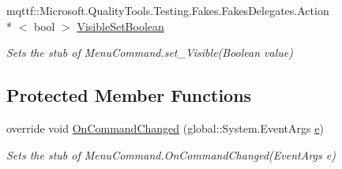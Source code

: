 \begin{DoxyCompactItemize}
mqttf\-::\-Microsoft.\-Quality\-Tools.\-Testing.\-Fakes.\-Fakes\-Delegates.\-Action\\*
$<$ bool $>$ \hyperlink{class_system_1_1_component_model_1_1_design_1_1_fakes_1_1_stub_designer_verb_a11a87d834a52ad8b5f003ac00c0f30b0}{Visible\-Set\-Boolean}
\begin{DoxyCompactList}\small\item\em Sets the stub of Menu\-Command.\-set\-\_\-\-Visible(\-Boolean value)\end{DoxyCompactList}\end{DoxyCompactItemize}
\subsection*{Protected Member Functions}
\begin{DoxyCompactItemize}
\item 
override void \hyperlink{class_system_1_1_component_model_1_1_design_1_1_fakes_1_1_stub_designer_verb_a05ad2a8a9d5b10f13aeabe15ba7e466f}{On\-Command\-Changed} (global\-::\-System.\-Event\-Args \hyperlink{jquery-1_810_82_8min_8js_a2c038346d47955cbe2cb91e338edd7e1}{e})
\begin{DoxyCompactList}\small\item\em Sets the stub of Menu\-Command.\-On\-Command\-Changed(\-Event\-Args e)\end{DoxyCompactList}\end{DoxyCompactItemize}
